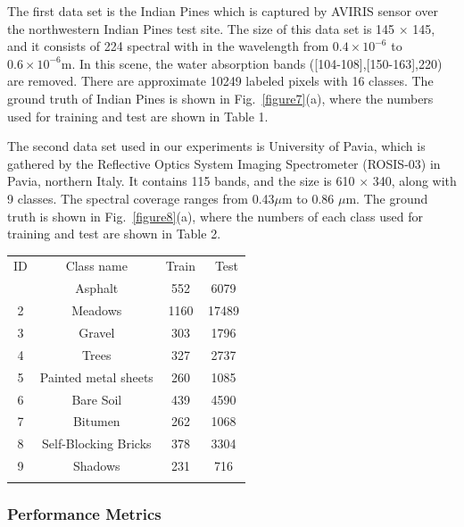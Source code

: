 \documentclass{ws-ijwmip}
\begin{document}
\begin{itemlist}
 \item The first data set is the Indian Pines which is captured by AVIRIS sensor over the northwestern Indian Pines test site. The size of this data set is 145 $\times$ 145, and it consists of 224 spectral with in the wavelength from $0.4 \times 10^{-6}$ to $0.6 \times 10^{-6}$m. In this scene, the water absorption bands ([104-108],[150-163],220) are removed. There are approximate 10249 labeled pixels with 16 classes. The ground truth of Indian Pines is shown in Fig.~\ref{figure7}(a), where the numbers used for training and test are shown in Table 1.
 
 \item The second data set used in our experiments is University of Pavia, which is gathered by the Reflective Optics System Imaging Spectrometer (ROSIS-03) in Pavia, northern Italy. It contains 115 bands, and the size is 610 $\times$ 340, along with 9 classes. The  spectral coverage ranges from 0.43$\mu$m to 0.86 $\mu$m. The ground truth is shown in Fig.~\ref{figure8}(a), where the numbers of each class used for training and test are shown in Table 2.

\end{itemlist}
\begin{table}[ht]
{\begin{tabular}{@{}cccc@{}} \toprule
ID & Class name & Train &\ Test \\
  \colrule
 1 & Asphalt & 552 & 6079 \\
             2 & Meadows	& 1160 & 17489 \\
             3 & Gravel	& 303 & 1796 \\
             4 & Trees & 327 & 2737 \\
             5 & Painted metal sheets	 & 260 & 1085 \\
             6 & Bare Soil	 & 439 & 4590 \\
             7 & Bitumen	 & 262 & 1068 \\
             8 & Self-Blocking Bricks	 & 378 & 3304 \\
             9 & Shadows & 231 & 716  \\ \botrule
\end{tabular}}
\label{table2}
\end{table}

\subsubsection{Performance Metrics }
\end{document}
